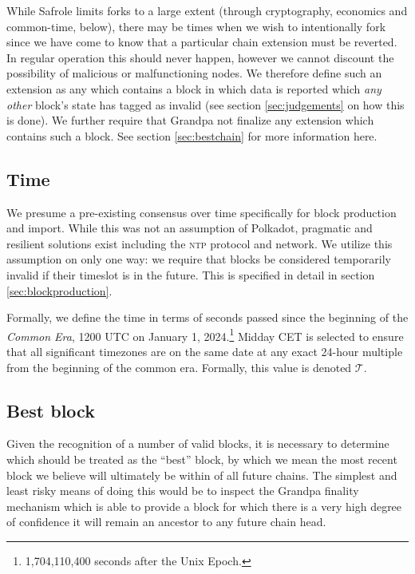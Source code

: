 While Safrole limits forks to a large extent (through cryptography, economics and common-time, below), there may be times when we wish to intentionally fork since we have come to know that a particular chain extension must be reverted. In regular operation this should never happen, however we cannot discount the possibility of malicious or malfunctioning nodes. We therefore define such an extension as any which contains a block in which data is reported which \emph{any other} block's state has tagged as invalid (see section \ref{sec:judgements} on how this is done). We further require that Grandpa not finalize any extension which contains such a block. See section \ref{sec:bestchain} for more information here.

\subsection{Time}\label{sec:commonera}

We presume a pre-existing consensus over time specifically for block production and import. While this was not an assumption of Polkadot, pragmatic and resilient solutions exist including the \textsc{ntp} protocol and network. We utilize this assumption on only one way: we require that blocks be considered temporarily invalid if their timeslot is in the future. This is specified in detail in section \ref{sec:blockproduction}.

Formally, we define the time in terms of seconds passed since the beginning of the \Jam\emph{Common Era}, 1200 UTC on January 1, 2024.\footnote{1,704,110,400 seconds after the Unix Epoch.} Midday CET is selected to ensure that all significant timezones are on the same date at any exact 24-hour multiple from the beginning of the common era. Formally, this value is denoted $\mathcal{T}$.

\subsection{Best block}

Given the recognition of a number of valid blocks, it is necessary to determine which should be treated as the ``best'' block, by which we mean the most recent block we believe will ultimately be within of all future \Jam chains. The simplest and least risky means of doing this would be to inspect the Grandpa finality mechanism which is able to provide a block for which there is a very high degree of confidence it will remain an ancestor to any future chain head.

